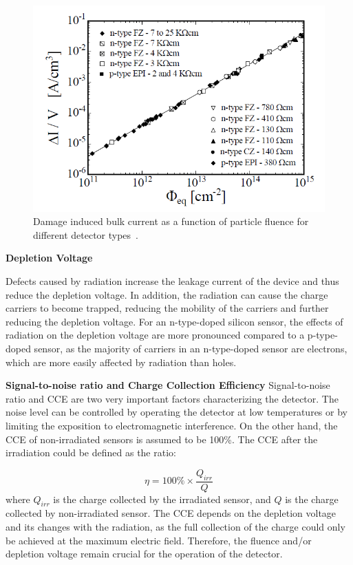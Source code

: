 \begin{figure}[!h]
\centering
\includegraphics[width=0.75\columnwidth]{Chapter2/images/lekage_current_fluence.png}
\caption{Damage induced bulk current as a function of particle fluence
for different detector types~\cite{Moll:1999kv}.}
\label{fig_leakage_theory}
\end{figure}
\textbf{Depletion Voltage}\bigbreak

Defects caused by radiation increase the leakage current of the device and thus reduce the depletion voltage. In addition, the radiation can cause the charge carriers to become trapped, reducing the mobility of the carriers and further reducing the depletion voltage. For an n-type-doped silicon sensor, the effects of radiation on the depletion voltage are more pronounced compared to a p-type-doped sensor, as the majority of carriers in an n-type-doped sensor are electrons, which are more easily affected by radiation than holes.  \bigbreak

\textbf{Signal-to-noise ratio and Charge Collection Efficiency }\bigbreak
Signal-to-noise ratio and CCE are two very important factors characterizing the detector. The noise level can be controlled by operating the detector at low temperatures or by limiting the exposition to electromagnetic interference. On the other hand, the CCE of non-irradiated sensors is assumed to be 100\%. The CCE after the irradiation could be defined as the ratio:

\begin{equation}
    \eta = 100\%\times\frac{Q_{irr}}{Q}
\end{equation}
where $Q_{irr}$ is the charge collected by the irradiated sensor, and $Q$ is the charge collected by non-irradiated sensor. 
The CCE depends on the depletion voltage and its changes with the radiation, as the full collection of the charge could only be achieved at the maximum electric field. Therefore, the fluence and/or depletion voltage remain crucial for the operation of the detector. 

